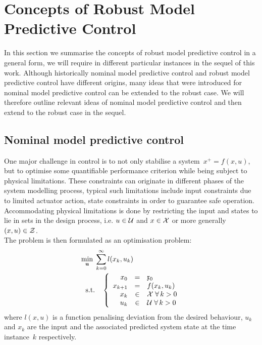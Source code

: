 \resetcounters
\chapter{Concepts of Robust Model Predictive Control}\label{ch:concepts:sec:RMPC}
%
%
%
%
\glsaddall
In this section we summarise the concepts of robust model predictive control in a general form, we will require in different particular instances in the sequel of this work.
%
Although historically nominal model predictive control and robust model predictive control have different origins, many ideas that were introduced for nominal model predictive control can be extended to the robust case.
%
We will therefore outline relevant ideas of nominal model predictive control and then extend to the robust case in the sequel.

\section{Nominal model predictive control}\label{ch:concepts:sec:RMPC:nominal:MPC}
\resetforsection
%
One major challenge in control is to not only stabilise a system~$x^+ = f(x,u)$, but to optimise some quantifiable performance criterion while being subject to physical limitations.
%
These constraints can originate in different phases of the system modelling process, typical such limitations include input constraints due to limited actuator action, state constraints in order to guarantee safe operation.
%
Accommodating physical limitations is done by restricting the input and states to lie in sets in the design process, i.e. $u\in\mathcal U$ and $x\in \mathcal X$ or more generally~$(x,u)\in\mathcal Z$.
%
\\[1em]
%
\noindent The problem is then formulated as an optimisation problem:
%
\begin{equation}\label{eq:infinite:horizon:problem:formulation}\begin{split}
	\min_{\mathbf{u}}\; &\sum_{k=0}^\infty l(x_k,u_k)\\
	\text{s.t.}&\quad\left\{
		\begin{array}{rcl}
		x_0 & = & \mathfrak{x}_0\\
		x_{k+1} & = & f(x_k,u_k)\\
		x_k & \in & \mathcal X\;\forall\,k>0\\
		u_k & \in & \mathcal U\;\forall\,k>0
		\end{array}\right.
	\end{split}
\end{equation}
%
where $l(x,u)$ is a function penalising deviation from the desired behaviour, $u_k$ and $x_k$ are the input and the associated predicted system state at the time instance~$k$ respectively.  
